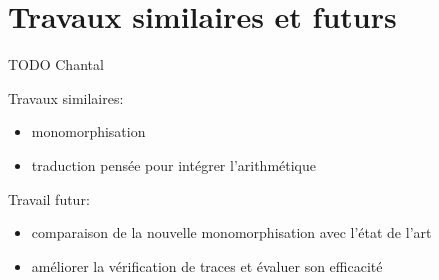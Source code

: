 \section{Travaux similaires et futurs}

TODO Chantal

Travaux similaires:
\begin{itemize}
\item monomorphisation
\item traduction pensée pour intégrer l'arithmétique
\end{itemize}

Travail futur:
\begin{itemize}
\item comparaison de la nouvelle monomorphisation avec l'état de l'art
\item améliorer la vérification de traces et évaluer son efficacité
\end{itemize}
